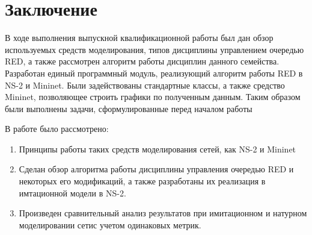 \chapter*{Заключение}

В ходе выполнения выпускной квалификационной работы был дан обзор используемых средств моделирования, типов дисциплины управлением очередью RED, а также рассмотрен алгоритм работы дисциплин данного семейства.
Разработан единый программный модуль, реализующий алгоритм работы RED в NS-2 и Mininet. Были задействованы стандартные классы, а также
средство Mininet, позволяющее строить графики по полученным данным.
Таким образом были выполнены задачи, сформулированные перед началом работы

В работе было рассмотрено:
\begin{enumerate}
\item Принципы работы таких средств моделирования сетей, как NS-2 и Mininet 
\item Сделан обзор алгоритма работы дисциплины управления очередью RED и некоторых его модификаций, а также
  разработаны их реализация в имтационной модели в NS-2.
\item Произведен сравнительный анализ результатов при имитационном и натурном моделировании сетис учетом одинаковых метрик. 
\end{enumerate}



\clearpage



